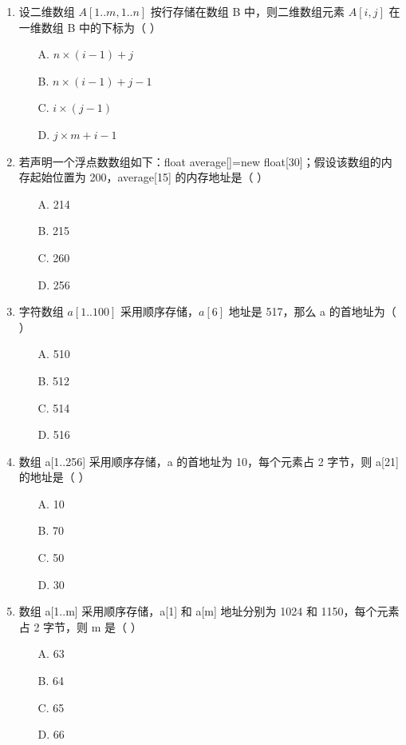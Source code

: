 \documentclass[12pt, a4paper]{article}
\begin{document}
\begin{enumerate}[label=\arabic*.]
	\item 设二维数组 $A[1..m, 1..n]$ 按行存储在数组 B 中，则二维数组元素 $A[i, j]$ 在一维数组 B 中的下标为（ ）
	      \begin{enumerate}
		      \item[A.] $n \times (i-1) + j$
		      \item[B.] $n \times (i-1) + j - 1$
		      \item[C.] $i \times (j-1)$
		      \item[D.] $j \times m + i - 1$
	      \end{enumerate}

	\item 若声明一个浮点数数组如下：float average[]=new float[30]；假设该数组的内存起始位置为 200，average[15] 的内存地址是（ ）
	      \begin{enumerate}
		      \item[A.] 214
		      \item[B.] 215
		      \item[C.] 260
		      \item[D.] 256
	      \end{enumerate}

	\item 字符数组 $a[1..100]$ 采用顺序存储，$a[6]$ 地址是 517，那么 a 的首地址为（ ）
	      \begin{enumerate}
		      \item[A.] 510
		      \item[B.] 512
		      \item[C.] 514
		      \item[D.] 516
	      \end{enumerate}

	\item 数组 a[1..256] 采用顺序存储，a 的首地址为 10，每个元素占 2 字节，则 a[21] 的地址是（ ）
	      \begin{enumerate}
		      \item[A.] 10
		      \item[B.] 70
		      \item[C.] 50
		      \item[D.] 30
	      \end{enumerate}

	\item 数组 a[1..m] 采用顺序存储，a[1] 和 a[m] 地址分别为 1024 和 1150，每个元素占 2 字节，则 m 是（ ）
	      \begin{enumerate}
		      \item[A.] 63
		      \item[B.] 64
		      \item[C.] 65
		      \item[D.] 66
	      \end{enumerate}


\end{enumerate}
\end{document}
